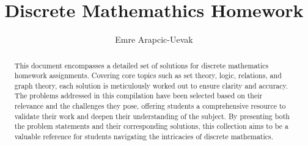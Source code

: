 \documentclass[a4paper, 10pt]{article}
\title{Discrete Mathemathics Homework}
\author{Emre Arapcic-Uevak}
\date{}
\begin{document}
	\maketitle
	\vspace{5mm}
	
	\begin{abstract}
		\begin{center}
			\noindent This document encompasses a detailed set of solutions for discrete mathematics homework assignments. Covering core topics such as set theory, logic, relations, and graph theory, each solution is meticulously worked out to ensure clarity and accuracy. The problems addressed in this compilation have been selected based on their relevance and the challenges they pose, offering students a comprehensive resource to validate their work and deepen their understanding of the subject. By presenting both the problem statements and their corresponding solutions, this collection aims to be a valuable reference for students navigating the intricacies of discrete mathematics.
		\end{center}
	\end{abstract}
	\pagebreak
	
	\tableofcontents
	\pagebreak
	
\end{document}
